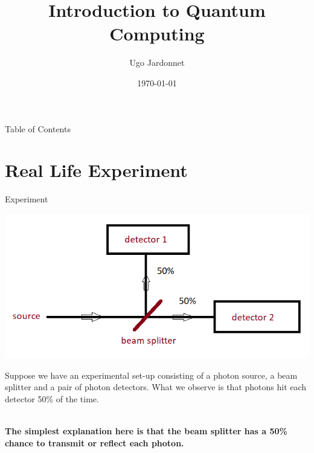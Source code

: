 \documentclass[svgnames,smaller]{beamer}
\title{Introduction to Quantum Computing}
\author{Ugo Jardonnet}
\date{\today}
\newcommand*{\cpp}{\texttt{C++}}
\newcommand*{\csharp}{\texttt{C\#}}
\begin{document}

\begin{frame}
  \titlepage
\end{frame}

\begin{frame}{Table of Contents}
  \tableofcontents
\end{frame}

\section{Real Life Experiment}

\begin{frame}[fragile]{Experiment}
   \begin{center}
      \includegraphics[height=.4\textheight]{exp1}
  \end{center}
  Suppose we have an experimental set-up consisting of a photon source, a beam splitter and a pair of photon detectors.
  What we observe is that photons hit each detector 50\% of the time. \\~\
  
  \noindent
  \textbf{The simplest explanation here is that the beam splitter has a 50\% chance to transmit or reflect each photon.}
\end{frame}
\end{document}
